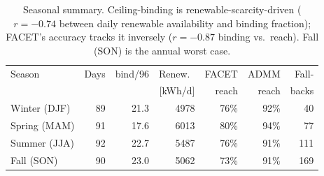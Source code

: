 \begin{table}[H]\centering\small
\begin{tabular}{lrrrrrr}
\toprule
Season & Days & bind/96 & Renew.\ & FACET & ADMM & Fall-\\
 & & & [kWh/d] & reach & reach & backs\\
\midrule
Winter (DJF) & 89 & 21.3 & 4978 & 76\% & 92\% & 40\\
Spring (MAM) & 91 & 17.6 & 6013 & 80\% & 94\% & 77\\
Summer (JJA) & 92 & 22.7 & 5487 & 76\% & 91\% & 111\\
Fall (SON) & 90 & 23.0 & 5062 & 73\% & 91\% & 169\\
\bottomrule
\end{tabular}
\caption{Seasonal summary. Ceiling-binding is renewable-scarcity-driven ($r=-0.74$ between daily renewable availability and binding fraction); FACET's accuracy tracks it inversely ($r=-0.87$ binding vs.\ reach). Fall (SON) is the annual worst case.}
\label{tab:year-seasonal}
\end{table}
